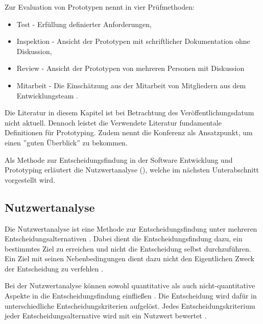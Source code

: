 Zur Evaluation von Prototypen nennt \citeauthor{Spitta.1989} in \autocite{Spitta.1989} vier Prüfmethoden:
\begin{itemize}
	\item Test - Erfüllung definierter Anforderungen,
	\item Inspektion - Ansicht der Prototypen mit schriftlicher Dokumentation ohne Diskussion,
	\item Review - Ansicht der Prototypen von mehreren Personen mit Diskussion
	\item Mitarbeit - Die Einschätzung aus der Mitarbeit von Mitgliedern aus dem Entwicklungsteam \autocite[vgl.][S. 21]{Spitta.1989}.
\end{itemize}

Die Literatur in diesem Kapitel ist bei Betrachtung des Veröffentlichungsdatum nicht aktuell.
Dennoch leistet die Verwendete Literatur fundamentale Definitionen für Prototyping.
Zudem nennt \citeauthor{Spitta.1989} die Konferenz \autocite{Budde.1984} als Ansatzpunkt, um einen ''guten Überblick'' \autocite[S. 5]{Spitta.1989} zu bekommen.

Als Methode zur Entscheidungsfindung in der Software Entwicklung und Prototyping erläutert \citeauthor{Spitta.1989} die Nutzwertanalyse (\citeyear[vgl.][S. 89]{Spitta.1989}), welche im nächsten Unterabschnitt vorgestellt wird.

\subsection{Nutzwertanalyse}
Die Nutzwertanalyse ist eine Methode zur Entscheidungsfindung unter mehreren Entscheidungsalternativen \autocite[vgl.][S. 45]{Zangemeister.1976} \autocite[vgl.][S. 74]{Kuhnapfel.2017}.
Dabei dient die Entscheidungsfindung dazu, ein bestimmtes Ziel zu erreichen und nicht die Entscheidung selbst durchzuführen.
Ein Ziel mit seinen Nebenbedingungen dient dazu nicht den Eigentlichen Zweck der Entscheidung zu verfehlen \autocite[vgl.][S. 75]{Kuhnapfel.2017}.

Bei der Nutzwertanalyse können sowohl quantitative als auch nicht-quantitative Aspekte in die Entscheidungsfindung einfließen \autocite[vgl.][S. 74]{Kuhnapfel.2017}.
Die Entscheidung wird dafür in unterschiedliche Entscheidungskriterien aufgelöst.
Jedes Entscheidungskriterium jeder Entscheidungsalternative wird mit ein Nutzwert bewertet \autocite[vgl.][S. 77]{Kuhnapfel.2017}.

